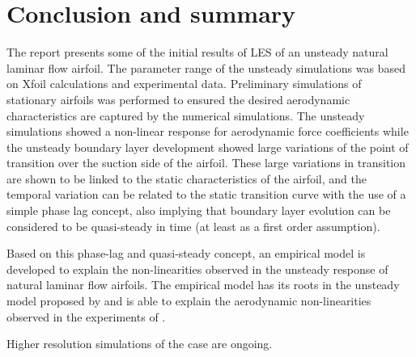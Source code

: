 \section{Conclusion and summary}
The report presents some of the initial results of LES of an unsteady natural laminar flow airfoil. The parameter range of the unsteady simulations was based on Xfoil calculations and experimental data. Preliminary simulations of stationary airfoils was performed to ensured the desired aerodynamic characteristics are captured by the numerical simulations. The unsteady simulations showed a non-linear response for aerodynamic force coefficients while the unsteady boundary layer development showed large variations of the point of transition over the suction side of the airfoil. These large variations in transition are shown to be linked to the static characteristics of the airfoil, and the temporal variation can be related to the static transition curve with the use of a simple phase lag concept, also implying that boundary layer evolution can be considered to be quasi-steady in time (at least as a first order assumption).

Based on this phase-lag and quasi-steady concept, an empirical model is developed to explain the non-linearities observed in the unsteady response of natural laminar flow airfoils. The empirical model has its roots in the unsteady model proposed by \cite{theodorsen35} and is able to explain the aerodynamic non-linearities observed in the experiments of \cite{lokattthesis}.

Higher resolution simulations of the case are ongoing.


%
%
%
